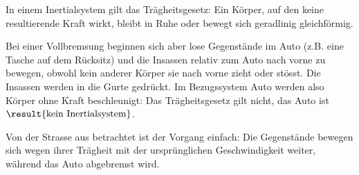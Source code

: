 In einem Inertialsystem gilt das Trägheitsgesetz: Ein Körper, auf den keine resultierende Kraft wirkt, bleibt in Ruhe oder bewegt sich geradlinig gleichförmig.

Bei einer Vollbremsung beginnen sich aber lose Gegenstände im Auto (z.B. eine Tasche auf dem Rücksitz) und die Insassen relativ zum Auto nach vorne zu bewegen, obwohl kein anderer Körper sie nach vorne zieht oder stösst. Die Insassen werden in die Gurte gedrückt. Im Bezugssystem Auto werden also Körper ohne Kraft beschleunigt: Das Trägheitsgesetz gilt nicht, das Auto ist $\result{\text{kein Inertialsystem}}$.

Von der Strasse aus betrachtet ist der Vorgang einfach: Die Gegenstände bewegen sich wegen ihrer Trägheit mit der ursprünglichen Geschwindigkeit weiter, während das Auto abgebremst wird.
